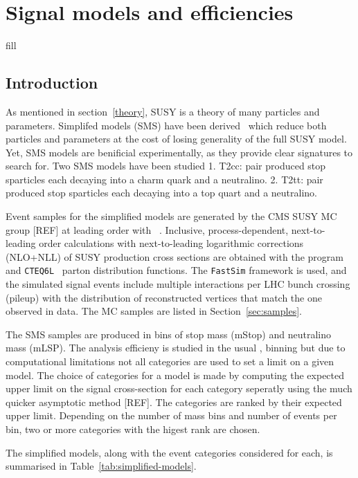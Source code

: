 \clearpage
\section{Signal models and efficiencies\label{sec:signal}}

fill 

\subsection{Introduction}

As mentioned in section~\ref{theory}, SUSY is a theory of many particles
and parameters.  Simplifed models (SMS) have been derived~\cite{Alwall:2008ag,Alwall:2008va,sms}
which reduce both particles and parameters at the cost of losing 
generality of the full SUSY model. Yet, SMS models are benificial experimentally,
as they provide clear signatures to search for.  Two SMS models have been studied
1. T2cc: pair produced stop sparticles each decaying into a charm quark and a neutralino.
2. T2tt: pair produced stop sparticles each decaying into a top quart and a neutralino.

Event samples for the simplified models are generated by the CMS SUSY MC group
[REF] at leading order with \MADGRAPH~\cite{madgraph}. Inclusive, process-dependent,
next-to-leading order calculations with next-to-leading logarithmic
corrections~\cite{susy-nlo-nll} (NLO+NLL) of SUSY production cross
sections are obtained with the program \PROSPINO~\cite{Beenakker1996ch} and
\verb!CTEQ6L!~\cite{Pumplin:2002vw} parton distribution functions. The
\texttt{FastSim} framework is used, and the simulated signal events
include multiple interactions per LHC bunch crossing (pileup) with the
distribution of reconstructed vertices that match the one observed in
data. The MC samples are listed in Section~\ref{sec:samples}.

The SMS samples are produced in bins of stop mass (mStop) and neutralino
mass (mLSP). The analysis efficieny is studied in the usual \njet, \nb binning
but due to computational limitations not all categories are used to set 
a limit on a given model. The choice of categories for a model is made by
computing the expected upper limit on the signal cross-section for each
category seperatly using the much quicker asymptotic method [REF]. The categories
are ranked by their expected upper limit. Depending on the number of 
mass bins and number of events per bin, two or more categories with the 
higest rank are chosen.

The simplified models, along with the event categories considered for each,
is summarised in Table~\ref{tab:simplified-models}.


